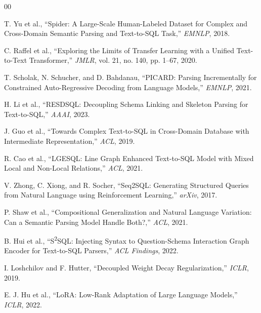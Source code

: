 \documentclass[conference]{IEEEtran}
\begin{document}
\begin{thebibliography}{00}

T. Yu et al., ``Spider: A Large-Scale Human-Labeled Dataset for Complex and Cross-Domain Semantic Parsing and Text-to-SQL Task,'' \textit{EMNLP}, 2018.

C. Raffel et al., ``Exploring the Limits of Transfer Learning with a Unified Text-to-Text Transformer,'' \textit{JMLR}, vol. 21, no. 140, pp. 1–67, 2020.

T. Scholak, N. Schucher, and D. Bahdanau, ``PICARD: Parsing Incrementally for Constrained Auto-Regressive Decoding from Language Models,'' \textit{EMNLP}, 2021.

H. Li et al., ``RESDSQL: Decoupling Schema Linking and Skeleton Parsing for Text-to-SQL,'' \textit{AAAI}, 2023.

J. Guo et al., ``Towards Complex Text-to-SQL in Cross-Domain Database with Intermediate Representation,'' \textit{ACL}, 2019.

R. Cao et al., ``LGESQL: Line Graph Enhanced Text-to-SQL Model with Mixed Local and Non-Local Relations,'' \textit{ACL}, 2021.

V. Zhong, C. Xiong, and R. Socher, ``Seq2SQL: Generating Structured Queries from Natural Language using Reinforcement Learning,'' \textit{arXiv}, 2017.

P. Shaw et al., ``Compositional Generalization and Natural Language Variation: Can a Semantic Parsing Model Handle Both?,'' \textit{ACL}, 2021.

B. Hui et al., ``S\textsuperscript{2}SQL: Injecting Syntax to Question-Schema Interaction Graph Encoder for Text-to-SQL Parsers,'' \textit{ACL Findings}, 2022.

I. Loshchilov and F. Hutter, ``Decoupled Weight Decay Regularization,'' \textit{ICLR}, 2019.

E. J. Hu et al., ``LoRA: Low-Rank Adaptation of Large Language Models,'' \textit{ICLR}, 2022.

\end{thebibliography}
\end{document}
